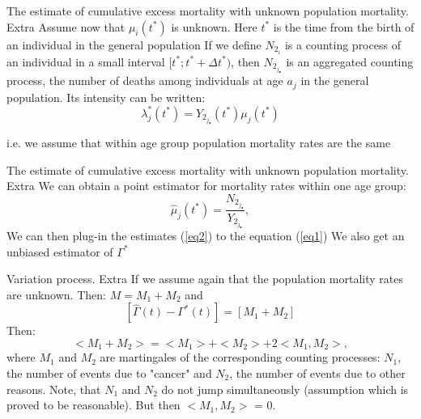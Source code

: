 \documentclass{beamer}
\begin{document}
\begin{frame}{The estimate of cumulative excess mortality with unknown population mortality. Extra}
Assume now that $\mu_i(t^*)$ is unknown. Here $t^*$ is the time from the birth of an individual in the general population
\newline
If we define $N_{2_i}$ is a counting process of an individual in a small interval $[t^*; t^*+\Delta t^*)$, then $N_{2_j_\bullet}$ is an aggregated counting process, the number of deaths among individuals at age $a_j$ in the general population.
\newline
\newline
Its intensity can be written:
$$\lambda^*_j(t^*)=Y_{2_j_\bullet}(t^*)\mu_j(t^*)$$

i.e. we assume that within age group population mortality rates are the same
\end{frame}


\begin{frame}{The estimate of cumulative excess mortality with unknown population mortality. Extra}
We can obtain a point estimator for mortality rates within one age group:
\begin{equation}
\label{eq2}
    \hat \mu_j(t^*) = \frac{N_2_j_{\bullet}}{Y_2_j_{\bullet}},
\end{equation}
 \newline
 \newline
We can then plug-in the estimates (\ref{eq2}) to the equation (\ref{eq1}) 
\newline
We also get an unbiased estimator of $\Gamma^*$
\end{frame}

\begin{frame}{Variation process. Extra}
If we assume again that the population mortality rates are unknown. Then: $M = M_1 + M_2$ and 
$$[\hat\Gamma(t) - \Gamma^*(t)] = [M_1 + M_2]$$
Then:
$$<M_1 + M_2> = <M_1> + <M_2> + 2<M_1,M_2>, $$
where $M_1$ and $M_2$ are martingales of the corresponding counting processes: $N_1$, the number of events due to "cancer" and $N_2$, the number of events due to other reasons.  
\newline
Note, that $N_1$ and $N_2$ do not jump simultaneously (assumption which is proved to be reasonable). But then $<M_1,M_2>$ = 0. 
\end{frame}
\end{document}
